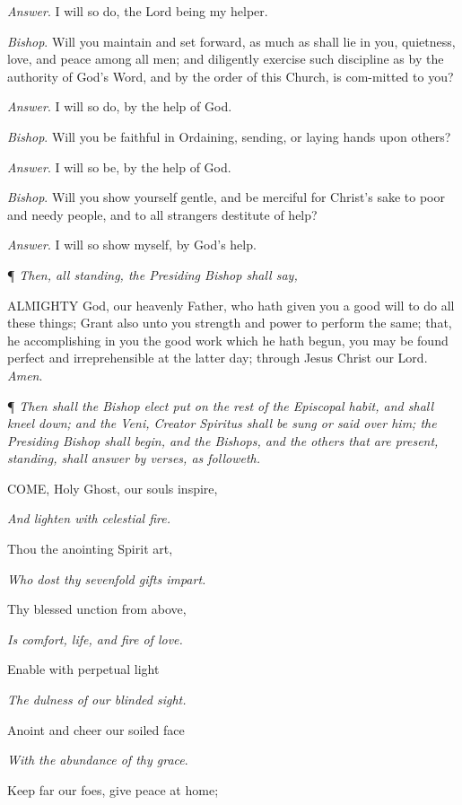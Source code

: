 \emph{Answer}. I will so do, the Lord being my helper.

\emph{Bishop}. Will you maintain and set forward,
as much as shall lie in you, quietness, love, and peace among all men;
and diligently exercise such discipline as by the authority of God's Word,
and by the order of this Church, is com-mitted to you?

\emph{Answer}. I will so do, by the help of God.

\emph{Bishop}. Will you be faithful in Ordaining,
sending, or laying hands upon others?

\emph{Answer}. I will so be, by the help of God.

\emph{Bishop}. Will you show yourself gentle,
and be merciful for Christ’s sake to poor and needy people, and
to all strangers destitute of help?

\emph{Answer}. I will so show myself, by God’s
help.

¶
\emph{Then, all standing, the Presiding Bishop shall say,}

ALMIGHTY
God, our heavenly Father, who hath given you a good will to do all these
things; Grant also unto you strength and power to perform the same; that,
he accomplishing in you the good work which he hath begun, you may be
found perfect and irreprehensible at the latter day; through Jesus Christ
our Lord. \emph{Amen}.

¶
\emph{Then shall the Bishop elect put on the rest of the Episcopal habit,
and shall kneel down; and the Veni, Creator Spiritus shall be sung or
said over him; the Presiding Bishop shall begin, and the Bishops, and
the others that are present, standing, shall answer by verses, as followeth.}

COME,
Holy Ghost, our souls inspire, 

\emph{And lighten with celestial fire.} 

Thou the anointing Spirit art, 

\emph{Who dost thy sevenfold gifts impart.}

Thy
blessed unction from above, 

\emph{Is comfort, life, and fire of love.}

Enable with perpetual light 

\emph{The dulness of our blinded sight.}

Anoint
and cheer our soiled face 

\emph{With the abundance of thy grace}. 

Keep far our foes, give peace at home; 

